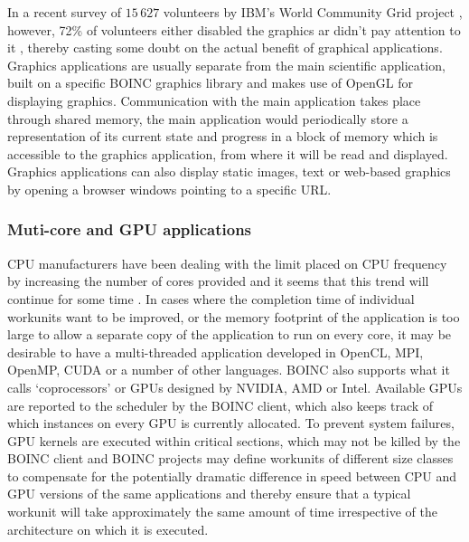   In a  recent survey of $15\,627$ volunteers by IBM's World Community Grid project \cite{wcg}, however, 72\% of volunteers either disabled the graphics ar didn't pay attention to it  \cite{wcg2013}, thereby casting some doubt on the actual benefit of graphical applications. Graphics applications are usually separate from the main scientific application, built on  a specific  BOINC graphics library and makes use of OpenGL \cite{opengl} for displaying graphics. Communication with the main application takes place through shared memory, the main application would periodically store a representation of its current state and progress in  a block of memory which is accessible to the graphics application, from where it will be read and displayed. Graphics applications can also display static images, text or web-based graphics by opening a browser windows pointing to a specific URL.

\subsubsection{Muti-core and GPU applications} \label{Bopencl}
CPU manufacturers have been dealing with the limit placed on CPU frequency by increasing the number of cores provided and it seems that this trend will continue for some time \cite{spu}. In cases where the completion time of individual workunits want to be improved, or the memory footprint of the application is too large to allow a separate copy of the application to run on every core, it may be desirable to have a multi-threaded application developed in OpenCL, MPI, OpenMP, CUDA or a number of other languages. BOINC also supports what it calls `coprocessors' or GPUs designed by NVIDIA, AMD or Intel. Available GPUs are reported to the scheduler by the BOINC client, which also keeps track of which instances on every GPU is currently allocated. To prevent system failures, GPU kernels are  executed within critical sections, which may not be killed by the BOINC client and  BOINC projects may define workunits of different size classes to compensate for the potentially dramatic difference in speed between CPU and GPU versions of the same applications and thereby ensure that a typical workunit will take approximately the same amount of time irrespective of the architecture on which it is executed.

